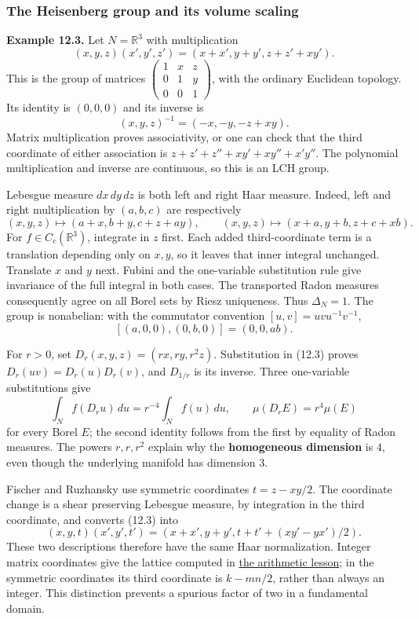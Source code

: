 \documentclass[
  english,
  11pt,
  a4paper,
]{article}
\begin{document}
\subsubsection{The Heisenberg group and its volume
scaling}\label{haar-measure-on-locally-compact-groups--heisenberg-haar-volume}

\textbf{Example 12.3.} Let \(N=\mathbb R^3\) with multiplication
\[(x,y,z)(x',y',z')=(x+x',y+y',z+z'+xy').
\tag{12.3}\] This is the group of matrices
\(\begin{pmatrix}1&x&z\\0&1&y\\0&0&1\end{pmatrix}\), with the ordinary
Euclidean topology. Its identity is \((0,0,0)\) and its inverse is
\[(x,y,z)^{-1}=(-x,-y,-z+xy).\] Matrix multiplication proves
associativity, or one can check that the third coordinate of either
association is \(z+z'+z''+xy'+xy''+x'y''\). The polynomial
multiplication and inverse are continuous, so this is an LCH group.

Lebesgue measure \(dx\,dy\,dz\) is both left and right Haar measure.
Indeed, left and right multiplication by \((a,b,c)\) are respectively
\[(x,y,z)\longmapsto(a+x,b+y,c+z+ay),\qquad
(x,y,z)\longmapsto(x+a,y+b,z+c+xb).\] For \(f\in C_c(\mathbb R^3)\),
integrate in \(z\) first. Each added third-coordinate term is a
translation depending only on \(x,y\), so it leaves that inner integral
unchanged. Translate \(x\) and \(y\) next. Fubini and the one-variable
substitution rule give invariance of the full integral in both cases.
The transported Radon measures consequently agree on all Borel sets by
Riesz uniqueness. Thus \(\Delta_N=1\). The group is nonabelian: with the
commutator convention \([u,v]=uvu^{-1}v^{-1}\),
\[[(a,0,0),(0,b,0)]=(0,0,ab).\]

For \(r>0\), set \(D_r(x,y,z)=(rx,ry,r^2z)\). Substitution in (12.3)
proves \(D_r(uv)=D_r(u)D_r(v)\), and \(D_{1/r}\) is its inverse. Three
one-variable substitutions give
\[\int_N f(D_ru)\,du=r^{-4}\int_Nf(u)\,du,
\qquad \mu(D_rE)=r^4\mu(E)
\tag{12.4}\] for every Borel \(E\); the second identity follows from the
first by equality of Radon measures. The powers \(r,r,r^2\) explain why
the \textbf{homogeneous dimension} is \(4\), even though the underlying
manifold has dimension \(3\).

Fischer and Ruzhansky use symmetric coordinates \(t=z-xy/2\). The
coordinate change is a shear preserving Lebesgue measure, by integration
in the third coordinate, and converts (12.3) into
\[(x,y,t)(x',y',t')=(x+x',y+y',t+t'+(xy'-yx')/2).\] These two
descriptions therefore have the same Haar normalization. Integer matrix
coordinates give the lattice computed in
\hyperref[finite-covolume-and-arithmetic-quotients--heisenberg-lattice-volume]{the
arithmetic lesson}; in the symmetric coordinates its third coordinate is
\(k-mn/2\), rather than always an integer. This distinction prevents a
spurious factor of two in a fundamental domain.
\end{document}
